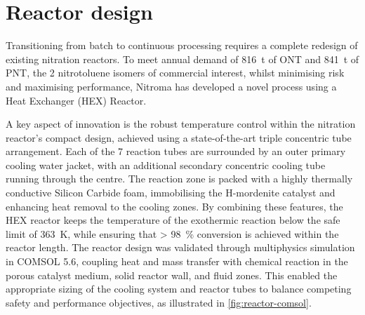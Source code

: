 \section*{Reactor design}
Transitioning from batch to continuous processing requires a complete redesign of existing nitration reactors. To meet annual demand of \SI{816}{\tonne} of ONT and \SI{841}{\tonne} of PNT, the 2 nitrotoluene isomers of commercial interest, whilst minimising risk and maximising performance, Nitroma has developed a novel process using a Heat Exchanger (HEX) Reactor.

A key aspect of innovation is the robust temperature control within the nitration reactor's compact design, achieved using a state-of-the-art triple concentric tube arrangement. Each of the 7 reaction tubes are surrounded by an outer primary cooling water jacket, with an additional secondary concentric cooling tube running through the centre. The reaction zone is packed with a highly thermally conductive Silicon Carbide foam, immobilising the H-mordenite catalyst and enhancing heat removal to the cooling zones. By combining these features, the HEX reactor keeps the temperature of the exothermic reaction below the safe limit of \SI{363}{\K}, while ensuring that \SI{> 98}{\percent} conversion is achieved within the reactor length. The reactor design was validated through multiphysics simulation in COMSOL 5.6, coupling heat and mass transfer with chemical reaction in the porous catalyst medium, solid reactor wall, and fluid zones. This enabled the appropriate sizing of the cooling system and reactor tubes to balance competing safety and performance objectives, as illustrated in \cref{fig:reactor-comsol}.

